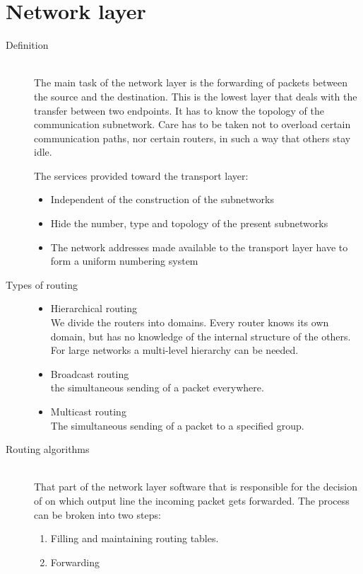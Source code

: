 \documentclass[margin=0px]{article}
\begin{document}
\section{Network layer}
\begin{description}
    \item[Definition] \hfill \\
        The main task of the network layer is the forwarding of packets between the source and the destination. This is the lowest layer that deals with the transfer between two endpoints. It has to know the topology of the communication subnetwork. Care has to be taken not to overload certain communication paths, nor certain routers, in such a way that others stay idle.

        The services provided toward the transport layer:
        \begin{itemize}
            \item Independent of the construction of the subnetworks
            \item Hide the number, type and topology of the present subnetworks
            \item The network addresses made available to the transport layer have to form a uniform numbering system
        \end{itemize}
    \item[Types of routing] \hfill
        \begin{itemize}
            \item Hierarchical routing\\
                  We divide the routers into domains. Every router knows its own domain, but has no knowledge of the internal structure of the others. For large networks a multi-level hierarchy can be needed.
            \item Broadcast routing\\
                  the simultaneous sending of a packet everywhere.
            \item Multicast routing\\
                  The simultaneous sending of a packet to a specified group.

        \end{itemize}

    \item[Routing algorithms] \hfill \\
        That part of the network layer software that is responsible for the decision of on which output line the incoming packet gets forwarded. The process can be broken into two steps:
        \begin{enumerate}
            \item Filling and maintaining routing tables.
            \item Forwarding
        \end{enumerate}


\end{description}
\end{document}
